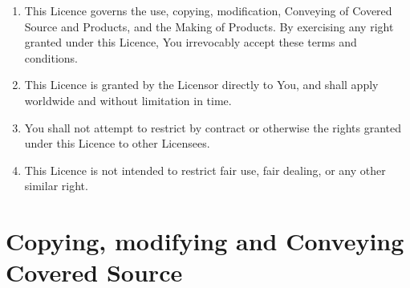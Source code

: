 \documentclass[10pt, a4paper]{article}
\begin{document}
\begin{enumerate}[label=\ref*{sec:applicability}.\arabic*]
\item This Licence governs the use, copying, modification, Conveying of Covered Source and Products, and the Making of Products. By exercising any right granted under this Licence, You irrevocably accept these terms and conditions.

\item This Licence is granted by the Licensor directly to You, and shall apply worldwide and without limitation in time. 

\item You shall not attempt to restrict by contract or otherwise the rights granted under this Licence to other Licensees.

\item This Licence is not intended to restrict fair use, fair dealing, or any other similar right.
\end{enumerate}

\section{Copying, modifying and Conveying Covered Source}
\label{sec:copying}
\end{document}
